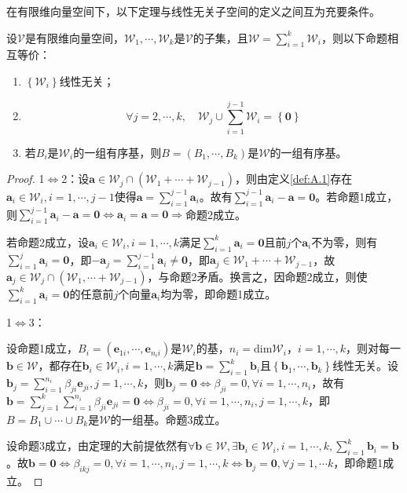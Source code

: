 \documentclass[main.tex]{subfiles}
\begin{document}
在有限维向量空间下，以下定理与线性无关子空间的定义之间互为充要条件。
\begin{theorem}\label{thm:A.2}
    设$\mathcal{V}$是有限维向量空间，$\mathcal{W}_1,\cdots,\mathcal{W}_k$是$\mathcal{V}$的子集，且$\mathcal{W}=\sum_{i=1}^k\mathcal{W}_i$，则以下命题相互等价：
    \begin{enumerate}
        \item $\left\{\mathcal{W}_i\right\}$线性无关；
        \item \[\forall j=2,\cdots,k,\quad\mathcal{W}_j\cup\sum_{i=1}^{j-1}\mathcal{W}_i=\left\{\mathbf{0}\right\}\]
        \item 若$B_i$是$\mathcal{W}_i$的一组有序基，则$B=\left(B_1,\cdots,B_k\right)$是$\mathcal{W}$的一组有序基。
    \end{enumerate}
\end{theorem}
\begin{proof}
    1$\Leftrightarrow$2：设$\mathbf{a}\in\mathcal{W}_j\cap\left(\mathcal{W}_1+\cdots+\mathcal{W}_{j-1}\right)$，则由定义\ref{def:A.1}存在$\mathbf{a}_i\in\mathcal{W}_i,i=1,\cdots,j-1$使得$\mathbf{a}=\sum_{i=1}^{j-1}\mathbf{a}_i$。故有$\sum_{i=1}^{j-1}\mathbf{a}_i-\mathbf{a}=\mathbf{0}$。若命题1成立，则$\sum_{i=1}^{j-1}\mathbf{a}_i-\mathbf{a}=\mathbf{0}\Leftrightarrow \mathbf{a}_i=\mathbf{a}=\mathbf{0}\Rightarrow$命题2成立。

    若命题2成立，设$\mathbf{a}_i\in\mathcal{W}_i,i=1,\cdots,k$满足$\sum_{i=1}^k\mathbf{a}_i=\mathbf{0}$且前$j$个$\mathbf{a}_i$不为零，则有$\sum_{i=1}^j\mathbf{a}_i=\mathbf{0}$，即$-\mathbf{a}_j=\sum_{i=1}^{j-1}\mathbf{a}_i\neq\mathbf{0}$，即$\mathbf{a}_j\in\mathcal{W}_1+\cdots+\mathcal{W}_{j-1}$，故$\mathbf{a}_j\in\mathcal{W}_j\cap\left(\mathcal{W}_1,\cdots+\mathcal{W}_{j-1}\right)$，与命题2矛盾。换言之，因命题2成立，则使$\sum_{i=1}^k\mathbf{a}_i=\mathbf{0}$的任意前$j$个向量$\mathbf{a}_i$均为零，即命题1成立。

    1$\Leftrightarrow$3：

    设命题1成立，$B_i=\left(\mathbf{e}_{1i},\cdots,\mathbf{e}_{n_ii}\right)$是$\mathcal{W}_i$的基，$n_i=\mathrm{dim}\mathcal{W}_i$，$i=1,\cdots,k$，则对每一$\mathbf{b}\in\mathcal{W}$，都存在$\mathbf{b}_i\in\mathcal{W}_i,i=1,\cdots,k$满足$\mathbf{b}=\sum_{i=1}^k\mathbf{b}_i$且$\left\{\mathbf{b}_1,\cdots,\mathbf{b}_k\right\}$线性无关。设$\mathbf{b}_j=\sum_{i=1}^{n_i}\beta_{ji}\mathbf{e}_{ji},j=1,\cdots,k$，则$\mathbf{b}_j=\mathbf{0}\Leftrightarrow\beta_{ji}=0,\forall i=1,\cdots,n_i$，故有$\mathbf{b}=\sum_{j=1}^k\sum_{i=1}^{n_i}\beta_{ji}\mathbf{e}_{ji}=\mathbf{0}\Leftrightarrow\beta_{ji}=0,\forall i=1,\cdots,n_i,j=1,\cdots,k$，即$B=B_1\cup\cdots\cup B_k$是$\mathcal{W}$的一组基。命题3成立。

    设命题3成立，由定理的大前提依然有$\forall\mathbf{b}\in\mathcal{W},\exists\mathbf{b}_i\in\mathcal{W}_i,i=1,\cdots,k,\sum_{i=1}^k\mathbf{b}_i=\mathbf{b}$。故$\mathbf{b}=\mathbf{0}\Leftrightarrow\beta_{ikj}=0,\forall i=1,\cdots,n_i,j=1,\cdots,k\Leftrightarrow\mathbf{b}_j=\mathbf{0},\forall j=1,\cdots k$，即命题1成立。
\end{proof}
\end{document}
